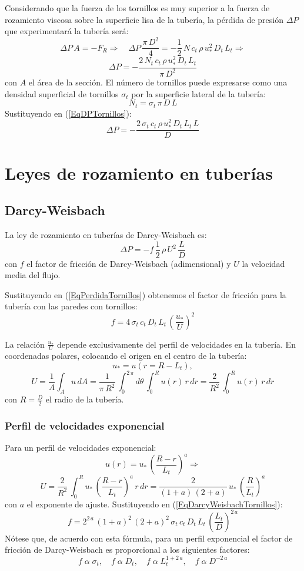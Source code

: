 \documentclass[a4paper]{article}
\newcommand{\EQ}[2]{\begin{equation}#1\label{#2}\end{equation}}
\begin{document}
Considerando que la fuerza de los tornillos es muy superior a la fuerza de
rozamiento viscosa sobre la superficie lisa de la tubería, la pérdida de presión
$\Delta P$ que experimentará la tubería será:
\[
  \Delta P\,A=-F_R\Rightarrow\quad
  \Delta P\,\frac{\pi\,D^2}{4}=-\frac12\,N\,c_t\,\rho\,u_*^2\,D_t\,L_t
  \Rightarrow
\]
\EQ{\Delta P=-\frac{2\,N_t\,c_t\,\rho\,u_*^2\,D_t\,L_t}{\pi\,D^2}}
{EqDPTornillos}
con $A$ el área de la sección. El número de tornillos puede expresarse como una
densidad superficial de tornillos $\sigma_t$ por la superficie lateral de la
tubería:
\EQ{N_t=\sigma_t\,\pi\,D\,L}{EqDensidadTornillos}
Sustituyendo en (\ref{EqDPTornillos}):
\EQ{\Delta P=-\frac{2\,\sigma_t\,c_t\,\rho\,u_*^2\,D_t\,L_t\,L}{D}}
{EqPerdidaTornillos}

\section{Leyes de rozamiento en tuberías}

\subsection{Darcy-Weisbach}

La ley de rozamiento en tuberías de Darcy-Weisbach es:
\EQ{\Delta P=-f\,\frac12\,\rho\,U^2\,\frac{L}{D}}{EqDarcyWeisbach}
con $f$ el factor de fricción de Darcy-Weisbach (adimensional) y $U$ la
velocidad media del flujo.

Sustituyendo en (\ref{EqPerdidaTornillos}) obtenemos el factor de fricción para
la tubería con las paredes con tornillos:
\EQ{f=4\,\sigma_t\,c_t\,D_t\,L_t\,\left(\frac{u_*}{U}\right)^2}
{EqDarcyWeisbachTornillos}

La relación $\frac{u_*}{U}$ depende exclusivamente del perfil de velocidades en
la tubería. En coordenadas polares, colocando el origen en el centro de la
tubería:
\[u_*=u\left(r=R-L_t\right),\]
\EQ
{
  U=\frac{1}{A}\int_Au\,dA=\frac1{\pi\,R^2}\,\int_0^{2\,\pi}d\theta\,
  \int_0^Ru(r)\,r\,dr=\frac2{R^2}\,\int_0^Ru(r)\,r\,dr
}{EqU}
con $R=\frac{D}{2}$ el radio de la tubería.

\subsubsection{Perfil de velocidades exponencial}

Para un perfil de velocidades exponencial:
\[u(r)=u_*\,\left(\frac{R-r}{L_t}\right)^a\Rightarrow\]
\EQ
{
  U=\frac2{R^2}\,\int_0^Ru_*\,\left(\frac{R-r}{L_t}\right)^a\,r\,dr
  =\frac2{(1+a)\,(2+a)}\,u_*\,\left(\frac{R}{L_t}\right)^a
}{EqUExponencial}
con $a$ el exponente de ajuste. Sustituyendo en
(\ref{EqDarcyWeisbachTornillos}):
\EQ
{
  f=2^{2\,a}\,(1+a)^2\,(2+a)^2\,\sigma_t\,c_t\,D_t\,L_t
  \,\left(\frac{L_t}{D}\right)^{2\,a}
}{EqfExponencial}
Nótese que, de acuerdo con esta fórmula, para un perfil exponencial el factor de
fricción de Darcy-Weisbach es proporcional a los siguientes factores:
\EQ
{
  f\;\alpha\;\sigma_t,\quad
  f\;\alpha\;D_t,\quad
  f\;\alpha\;L_t^{1+2\,a},\quad
  f\;\alpha\;D^{-2\,a}
}{EqfExponencialFactores}
\end{document}
